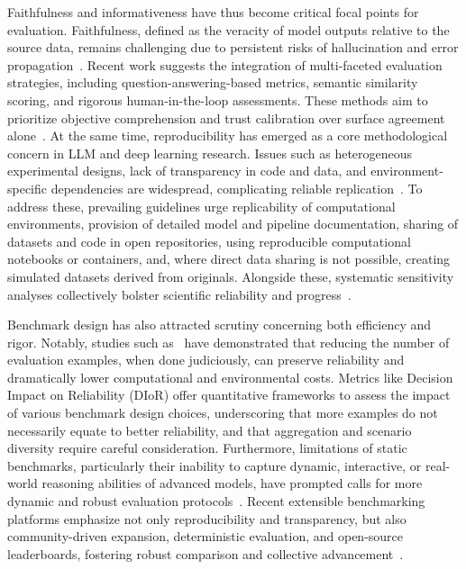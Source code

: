 \documentclass[sigconf]{acmart}
\begin{document}
Faithfulness and informativeness have thus become critical focal points for evaluation. Faithfulness, defined as the veracity of model outputs relative to the source data, remains challenging due to persistent risks of hallucination and error propagation~\cite{ref91, ref101, ref106, ref108}. Recent work suggests the integration of multi-faceted evaluation strategies, including question-answering-based metrics, semantic similarity scoring, and rigorous human-in-the-loop assessments. These methods aim to prioritize objective comprehension and trust calibration over surface agreement alone~\cite{ref94, ref101, ref104}. At the same time, reproducibility has emerged as a core methodological concern in LLM and deep learning research. Issues such as heterogeneous experimental designs, lack of transparency in code and data, and environment-specific dependencies are widespread, complicating reliable replication~\cite{ref76, ref95, ref106}. To address these, prevailing guidelines urge replicability of computational environments, provision of detailed model and pipeline documentation, sharing of datasets and code in open repositories, using reproducible computational notebooks or containers, and, where direct data sharing is not possible, creating simulated datasets derived from originals. Alongside these, systematic sensitivity analyses collectively bolster scientific reliability and progress~\cite{ref76, ref106, ref108}.

Benchmark design has also attracted scrutiny concerning both efficiency and rigor. Notably, studies such as~\cite{ref104} have demonstrated that reducing the number of evaluation examples, when done judiciously, can preserve reliability and dramatically lower computational and environmental costs. Metrics like Decision Impact on Reliability (DIoR) offer quantitative frameworks to assess the impact of various benchmark design choices, underscoring that more examples do not necessarily equate to better reliability, and that aggregation and scenario diversity require careful consideration. Furthermore, limitations of static benchmarks, particularly their inability to capture dynamic, interactive, or real-world reasoning abilities of advanced models, have prompted calls for more dynamic and robust evaluation protocols~\cite{ref76, ref91, ref94, ref101, ref104}. Recent extensible benchmarking platforms emphasize not only reproducibility and transparency, but also community-driven expansion, deterministic evaluation, and open-source leaderboards, fostering robust comparison and collective advancement~\cite{ref101}.
\end{document}

